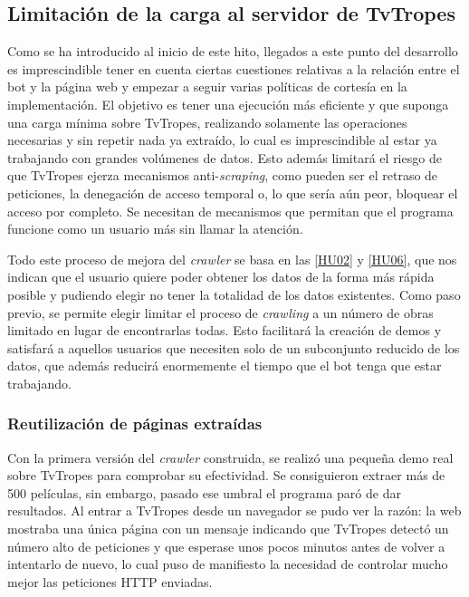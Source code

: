 \subsection{Limitación de la carga al servidor de TvTropes}
Como se ha introducido al inicio de este hito, llegados a este punto del
desarrollo es imprescindible tener en cuenta ciertas cuestiones relativas a la
relación entre el bot y la página web y empezar a seguir varias políticas de
cortesía en la implementación. El objetivo es tener una ejecución más eficiente
y que suponga una carga mínima sobre TvTropes, realizando solamente las
operaciones necesarias y sin repetir nada ya extraído, lo cual es imprescindible
al estar ya trabajando con grandes volúmenes de datos. Esto además limitará el
riesgo de que TvTropes ejerza mecanismos anti-\textit{scraping}, como pueden ser
el retraso de peticiones, la denegación de acceso temporal o, lo que sería aún
peor, bloquear el acceso por completo. Se necesitan de mecanismos que permitan
que el programa funcione como un usuario más sin llamar la atención.

Todo este proceso de mejora del \textit{crawler} se basa en las
\href{https://github.com/jlgallego99/TropesToGo/issues/7}{[HU02]} y
\href{https://github.com/jlgallego99/TropesToGo/issues/45}{[HU06]}, que nos
indican que el usuario quiere poder obtener los datos de la forma más rápida
posible y pudiendo elegir no tener la totalidad de los datos existentes. Como
paso previo, se permite elegir limitar el proceso de \textit{crawling} a un
número de obras limitado en lugar de encontrarlas todas. Esto facilitará la
creación de demos y satisfará a aquellos usuarios que necesiten solo de un
subconjunto reducido de los datos, que además reducirá enormemente el tiempo que
el bot tenga que estar trabajando.

\subsubsection{Reutilización de páginas extraídas}
Con la primera versión del \textit{crawler} construida, se realizó una pequeña
demo real sobre TvTropes para comprobar su efectividad. Se consiguieron extraer
más de 500 películas, sin embargo, pasado ese umbral el programa paró de dar
resultados. Al entrar a TvTropes desde un navegador se pudo ver la razón: la web
mostraba una única página con un mensaje indicando que TvTropes detectó un
número alto de peticiones y que esperase unos pocos minutos antes de volver a
intentarlo de nuevo, lo cual puso de manifiesto la necesidad de controlar mucho
mejor las peticiones HTTP enviadas.

